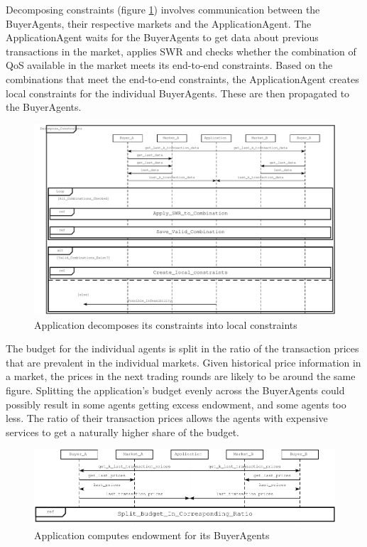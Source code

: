 \documentclass[10pt,journal,compsoc]{IEEEtran}
\begin{document}
Decomposing constraints (figure \ref{fig:decompose_constraints}) involves communication between the BuyerAgents, their respective markets and the ApplicationAgent. The ApplicationAgent waits for the BuyerAgents to get data about previous transactions in the market, applies SWR \cite{Cardoso2002Workflow} and checks whether the combination of QoS available in the market meets its end-to-end constraints. Based on the combinations that meet the end-to-end constraints, the ApplicationAgent creates local constraints for the individual BuyerAgents. These are then propagated to the BuyerAgents.
\begin{figure}[h]
\centering
\includegraphics[scale=0.3]{drawings/decompose_constraints.pdf}
\caption{Application decomposes its constraints into local constraints \label{fig:decompose_constraints}}
\end{figure}

The budget for the individual agents is split in the ratio of the transaction prices that are prevalent in the individual markets. Given historical price information in a market, the prices in the next trading rounds are likely to be around the same figure. Splitting the application's budget evenly across the BuyerAgents could possibly result in some agents getting excess endowment, and some agents too less. The ratio of their transaction prices allows the agents with expensive services to get a naturally higher share of the budget.
\begin{figure}[h]
\centering
\includegraphics[scale=0.4]{drawings/compute_endowment.pdf}
\caption{Application computes endowment for its BuyerAgents}
\end{figure}
\end{document}
